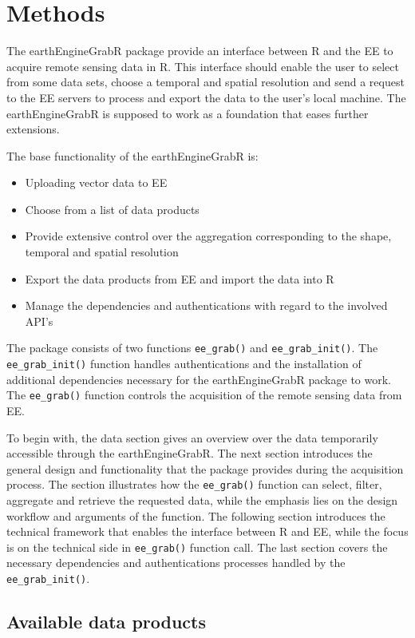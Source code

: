 \chapter{Methods}

The earthEngineGrabR package provide an interface between R and the EE to acquire remote sensing data in R. This interface should enable the user to select from some data sets, choose a temporal and spatial resolution and send a request to the EE servers to process and export the data to the user's local machine. The earthEngineGrabR is supposed to work as a foundation that eases further extensions.

The base functionality of the earthEngineGrabR is: 
\begin{itemize}
	\item Uploading vector data to EE
	\item Choose from a list of data products
	\item Provide extensive control over the aggregation corresponding to the shape, temporal and spatial resolution
	\item Export the data products from EE and import the data into R
	\item Manage the dependencies and authentications with regard to the involved API's
\end{itemize}

The package consists of two functions \mbox{\texttt{ee\_grab()}} and \mbox{\texttt{ee\_grab\_init()}}. The \texttt{ee\_grab\_init()} function handles authentications and the installation of additional dependencies necessary for the earthEngineGrabR package to work. The \texttt{ee\_grab()} function controls the acquisition of the remote sensing data from EE.

To begin with, the data section gives an overview over the data temporarily accessible through the earthEngineGrabR. 
The next section introduces the general design and functionality that the package provides during the acquisition process. The section illustrates how the \texttt{ee\_grab()} function can select, filter, aggregate and retrieve the requested data, while the emphasis lies on the design workflow and arguments of the function.
The following section introduces the technical framework that enables the interface between R and EE, while the focus is on the technical side in \texttt{ee\_grab()} function call.
The last section covers the necessary dependencies and authentications processes handled by the \texttt{ee\_grab\_init()}.

\section{Available data products}

